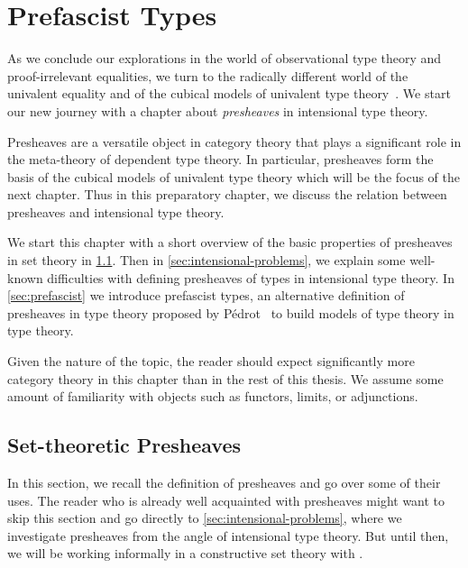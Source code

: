 \setchapterpreamble[u]{\margintoc}
\chapter{Prefascist Types}

As we conclude our explorations in the world of observational type theory 
and proof-irrelevant equalities, we turn to the radically different world 
of the univalent equality and of the cubical models of univalent type 
theory~\cite{BezemCoquandHuber14, CCHM}. We start our new journey with
a chapter about \emph{presheaves} in intensional type theory.

Presheaves are a versatile object in category theory that plays a significant
role in the meta-theory of dependent type theory. 
In particular, presheaves form the basis of the cubical models of univalent type
theory which will be the focus of the next chapter.
Thus in this preparatory chapter, we discuss the relation between presheaves and 
intensional type theory.

We start this chapter with a short overview of the basic properties of presheaves in
set theory in \cref{sec:categorical-reminders}. Then in 
\cref{sec:intensional-problems}, we explain some well-known difficulties
with defining presheaves of types in intensional type theory. In
\cref{sec:prefascist} we introduce prefascist types, an alternative
definition of presheaves in type theory proposed by 
Pédrot~ to build models of type theory in
type theory.

Given the nature of the topic, the reader should expect significantly more
category theory in this chapter than in the rest of this thesis. 
We assume some amount of familiarity with objects such as functors, limits, 
or adjunctions.

\section{Set-theoretic Presheaves}
\label{sec:categorical-reminders}

In this section, we recall the definition of presheaves and go 
over some of their uses.
% 
The reader who is already well acquainted with presheaves might want to skip
this section and go directly to \cref{sec:intensional-problems}, where we
investigate presheaves from the angle of intensional type theory.
% 
But until then, we will be working informally in a constructive set theory with
.

